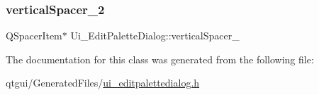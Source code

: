 \mbox{\label{class_ui___edit_palette_dialog_a6dc68e3b37d057b6b6f3793e494f3d43}} 
\subsubsection{\texorpdfstring{verticalSpacer\_2}{verticalSpacer\_2}}
{\footnotesize\ttfamily Q\+Spacer\+Item$\ast$ Ui\+\_\+\+Edit\+Palette\+Dialog\+::vertical\+Spacer\+\_}



The documentation for this class was generated from the following file\+:\begin{DoxyCompactItemize}
\item 
qtgui/\+Generated\+Files/\mbox{\hyperlink{ui__editpalettedialog_8h}{ui\+\_\+editpalettedialog.\+h}}\end{DoxyCompactItemize}
